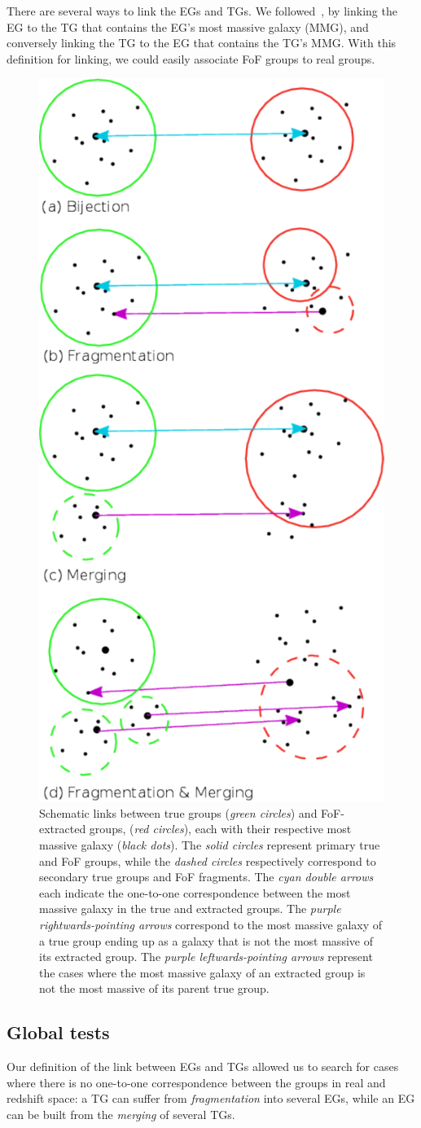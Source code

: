 There are several ways to link the EGs and TGs. We followed~\cite{Yang+07}, by
linking the EG to the TG that contains the EG's most massive galaxy (MMG), and
conversely linking the TG to the EG that contains the TG's MMG\@. With this
definition for linking, we could easily associate FoF groups to real groups.
%
\begin{figure}
    \centering
    \includegraphics[width=0.3\linewidth]{figures/fof/bijection.pdf}%
    \caption{Schematic links between true groups (\emph{green circles}) and
    FoF-extracted groups, (\emph{red circles}), each with their respective
    most massive galaxy (\emph{black dots}).
    The \emph{solid circles } represent primary true and FoF groups, while the
    \emph{dashed circles} respectively correspond to secondary true groups and
    FoF fragments.
    The \emph{cyan double arrows} each indicate the one-to-one correspondence
    between the most massive galaxy in the true and extracted groups.
    The \emph{purple rightwards-pointing  arrows} correspond to the most
    massive galaxy of a true group ending up as a galaxy that is not the most
    massive of its extracted group.
    The \emph{purple leftwards-pointing arrows} represent the cases where the
    most massive galaxy of an extracted group is not the most massive of its
    parent true group.
\label{fig:CRdef}}
\end{figure}

\subsection{Global tests}

Our definition of the link between EGs and TGs allowed us to search for cases
where there is no one-to-one correspondence between the groups in real and
redshift space: a TG can suffer from  \emph{fragmentation} into several EGs,
while an EG can be built from the \emph{merging} of several TGs.

